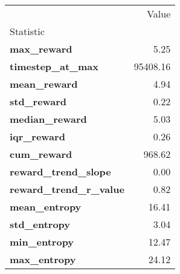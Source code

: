 \begin{tabular}{lr}
\toprule
 & Value \\
Statistic &  \\
\midrule
\textbf{max\_reward} & 5.25 \\
\textbf{timestep\_at\_max} & 95408.16 \\
\textbf{mean\_reward} & 4.94 \\
\textbf{std\_reward} & 0.22 \\
\textbf{median\_reward} & 5.03 \\
\textbf{iqr\_reward} & 0.26 \\
\textbf{cum\_reward} & 968.62 \\
\textbf{reward\_trend\_slope} & 0.00 \\
\textbf{reward\_trend\_r\_value} & 0.82 \\
\textbf{mean\_entropy} & 16.41 \\
\textbf{std\_entropy} & 3.04 \\
\textbf{min\_entropy} & 12.47 \\
\textbf{max\_entropy} & 24.12 \\
\bottomrule
\end{tabular}
